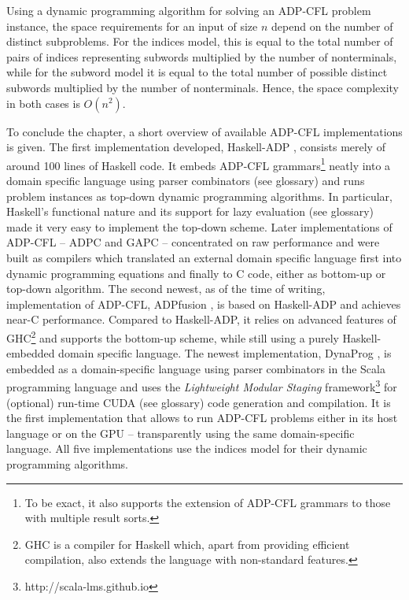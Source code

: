 \documentclass[
    a4paper,
    12pt,
    twoside,
    BCOR=12mm,
    parskip=half,
    chapterprefix,
    numbers=noenddot,
    bibliography=totoc
]{scrbook}
\begin{document}
Using a dynamic programming algorithm for solving an ADP-CFL problem instance, the space requirements for an input of size $n$ depend on the number of distinct subproblems. For the indices model, this is equal to the total number of pairs of indices representing subwords multiplied by the number of nonterminals, while for the subword model it is equal to the total number of possible distinct subwords multiplied by the number of nonterminals. Hence, the space complexity in both cases is $O(n^2)$.

To conclude the chapter, a short overview of available ADP-CFL implementations is given. The first implementation developed, Haskell-ADP \citep{giegerich_discipline_2004}, consists merely of around 100 lines of Haskell code. It embeds ADP-CFL grammars\footnote{To be exact, it also supports the extension of ADP-CFL grammars to those with multiple result sorts.} neatly into a domain specific language using parser combinators (see glossary) and runs problem instances as top-down dynamic programming algorithms. In particular, Haskell's functional nature and its support for lazy evaluation (see glossary) made it very easy to implement the top-down scheme. Later implementations of ADP-CFL -- ADPC \citep{steffen_compiling_2006} and GAPC \citep{sauthoff_bellmans_2011} -- concentrated on raw performance and were built as compilers which translated an external domain specific language first into dynamic programming equations and finally to C code, either as bottom-up or top-down algorithm. The second newest, as of the time of writing, implementation of ADP-CFL, ADPfusion \citep{honer_zu_siederdissen_sneaking_2012}, is based on Haskell-ADP and achieves near-C performance. Compared to Haskell-ADP, it relies on advanced features of GHC\footnote{GHC is a compiler for Haskell which, apart from providing efficient compilation, also extends the language with non-standard features.} and supports the bottom-up scheme, while still using a purely Haskell-embedded domain specific language. The newest implementation, DynaProg \citep{coppey_dynaprog_2012}, is embedded as a domain-specific language using parser combinators in the Scala programming language and uses the \emph{Lightweight Modular Staging} framework\footnote{http://scala-lms.github.io} for (optional) run-time CUDA (see glossary) code generation and compilation. It is the first implementation that allows to run ADP-CFL problems either in its host language or on the GPU -- transparently using the same domain-specific language. All five implementations use the indices model for their dynamic programming algorithms.
  
\end{document}
